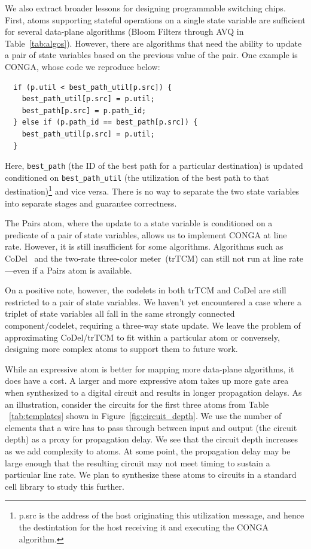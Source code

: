 We also extract broader lessons for designing programmable switching chips.
First, atoms supporting stateful operations on a single state variable are
sufficient for several data-plane algorithms (Bloom Filters through AVQ in
Table~\ref{tab:algos}). However, there are algorithms that need the ability to
update a pair of state variables based on the previous value of the pair. One
example is CONGA, whose code we reproduce below:
\begin{verbatim}
  if (p.util < best_path_util[p.src]) {
    best_path_util[p.src] = p.util;
    best_path[p.src] = p.path_id;
  } else if (p.path_id == best_path[p.src]) {
    best_path_util[p.src] = p.util;
  }
\end{verbatim}
Here, \texttt{best\_path} (the ID of the best path for a particular
destination) is updated conditioned on \texttt{best\_path\_util} (the
utilization of the best path to that destination)\footnote{p.src is the address
  of the host originating this utilization message, and hence the
destintation for the host receiving it and executing the CONGA algorithm.} and
vice versa. There is no way to separate the two state variables into separate
stages and guarantee correctness.

The Pairs atom, where the update to a state variable is conditioned on a
predicate of a pair of state variables, allows us to implement CONGA at line
rate.  However, it is still insufficient for some algorithms. Algorithms such
as CoDel~\cite{codel} and the two-rate three-color meter~\cite{trTCM}(trTCM)
can still not run at line rate---even if a Pairs atom is available.

On a positive note, however, the codelets in both trTCM and CoDel are still
restricted to a pair of state variables.  We haven't yet encountered a case
where a triplet of state variables all fall in the same strongly connected
component/codelet, requiring a three-way state update.  We leave the problem of
approximating CoDel/trTCM to fit within a particular atom or conversely,
designing more complex atoms to support them to future work.

While an expressive atom is better for mapping more data-plane algorithms, it
does have a cost. A larger and more expressive atom takes up more gate area
when synthesized to a digital circuit and results in longer propagation delays.
As an illustration, consider the circuits for the first three atoms from Table
~\ref{tab:templates} shown in Figure~\ref{fig:circuit_depth}. We use the number
of elements that a wire has to pass through between input and output (the
circuit depth) as a proxy for propagation delay. We see that the circuit depth
increases as we add complexity to atoms. At some point, the propagation delay
may be large enough that the resulting circuit may not meet timing to sustain a
particular line rate. We plan to synthesize these atoms to circuits in a
standard cell library to study this further.

